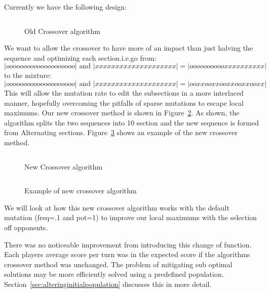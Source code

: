 Currently we have the following design:
\begin{figure}
    \inputminted{python}{code_snippets/oldCrossover.py}
    \caption{Old Crossover algorithm}\label{fig:oldCrossover}
\end{figure}

We want to allow the crossover to have more of an impact than just halving the sequence and optimizing each section.i.e.go from:
\[|oooooooooooooooooooo| \text{ and } |xxxxxxxxxxxxxxxxxxxx|= |ooooooooooxxxxxxxxxx|\]
to the mixture:
\[|oooooooooooooooooooo|\text{ and } |xxxxxxxxxxxxxxxxxxxx|= |ooxxooxxooxxooxxooxx|\]
This will allow the mutation rate to edit the subsections in a more interlaced manner, hopefully overcoming the pitfalls of sparse mutations to escape local maximums.
Our new crossover method is shown in Figure~\ref{fig:newCrossover}.
As shown, the algorithm splits the two sequences into 10 section and the new sequence is formed from Alternating sections.
Figure~\ref{fig:newCrossoverEX} shows an example of the new crossover method.

\begin{figure}
    \inputminted{python}{code_snippets/newCrossover.py}
    \caption{New Crossover algorithm}\label{fig:newCrossover}
\end{figure}

\begin{figure}
    \inputminted{python}{code_snippets/newCrossoverEX.py}
    \caption{Example of new crossover algorithm}\label{fig:newCrossoverEX}
\end{figure}

We will look at how this new crossover algorithm works with the default mutation (freq=.1 and pot=1) to improve our local maximums with the selection off opponents.

There was no noticeable improvement from introducing this change of function.
Each players average score per turn was in the expected score if the algorithms crossover method was unchanged.
The problem of mitigating sub optimal solutions may be more efficiently solved using a predefined population.
Section~\ref{sec:alteringinitialpopulation} discusses this in more detail.

